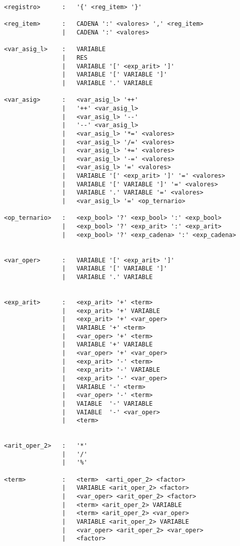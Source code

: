 \begin{verbatim}
<registro>      :   '{' <reg_item> '}'

<reg_item>      :   CADENA ':' <valores> ',' <reg_item>
                |   CADENA ':' <valores> 

<var_asig_l>    :   VARIABLE
                |   RES
                |   VARIABLE '[' <exp_arit> ']' 
                |   VARIABLE '[' VARIABLE ']' 
                |   VARIABLE '.' VARIABLE 

<var_asig>      :   <var_asig_l> '++'
                |   '++' <var_asig_l>
                |   <var_asig_l> '--'
                |   '--' <var_asig_l>
                |   <var_asig_l> '*=' <valores>
                |   <var_asig_l> '/=' <valores>
                |   <var_asig_l> '+=' <valores>
                |   <var_asig_l> '-=' <valores>
                |   <var_asig_l> '=' <valores>
                |   VARIABLE '[' <exp_arit> ']' '=' <valores>
                |   VARIABLE '[' VARIABLE ']' '=' <valores>
                |   VARIABLE '.' VARIABLE '=' <valores>
                |   <var_asig_l> '=' <op_ternario>

<op_ternario>   :   <exp_bool> '?' <exp_bool> ':' <exp_bool>
                |   <exp_bool> '?' <exp_arit> ':' <exp_arit>
                |   <exp_bool> '?' <exp_cadena> ':' <exp_cadena>


<var_oper>      :   VARIABLE '[' <exp_arit> ']' 
                |   VARIABLE '[' VARIABLE ']' 
                |   VARIABLE '.' VARIABLE 

 
<exp_arit>      :   <exp_arit> '+' <term>
                |   <exp_arit> '+' VARIABLE
                |   <exp_arit> '+' <var_oper>
                |   VARIABLE '+' <term>
                |   <var_oper> '+' <term>
                |   VARIABLE '+' VARIABLE
                |   <var_oper> '+' <var_oper>
                |   <exp_arit> '-' <term>
                |   <exp_arit> '-' VARIABLE
                |   <exp_arit> '-' <var_oper>
                |   VARIABLE '-' <term>
                |   <var_oper> '-' <term>
                |   VAIABLE  '-' VARIABLE
                |   VAIABLE  '-' <var_oper>
                |   <term>


<arit_oper_2>   :   '*'
                |   '/'
                |   '%'

<term>          :   <term>  <arti_oper_2> <factor>
                |   VARIABLE <arit_oper_2> <factor>
                |   <var_oper> <arit_oper_2> <factor>
                |   <term> <arit_oper_2> VARIABLE
                |   <term> <arit_oper_2> <var_oper>
                |   VARIABLE <arit_oper_2> VARIABLE
                |   <var_oper> <arit_oper_2> <var_oper> 
                |   <factor>


\end{verbatim}

